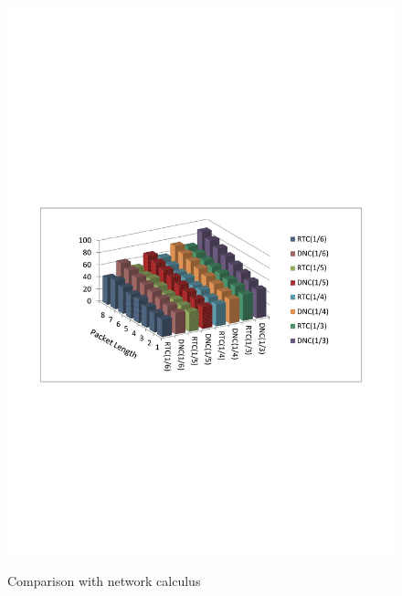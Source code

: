 \documentclass[preprint]{elsarticle}
\begin{document}
\begin{figure}
  \centering
  \includegraphics[scale=0.8]{figures/rtcvsdnc.pdf}\\
  \caption{Comparison with network calculus}\label{comparison}
\end{figure}
\end{document}
